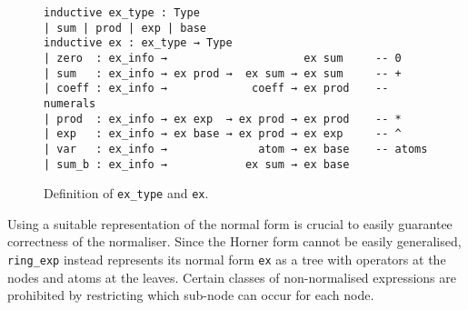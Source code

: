 \documentclass{llncs}
\newcommand{\lean}[1]{\texttt{#1}\xspace} %
\newcommand{\ex}{\lean{ex}}
\newcommand{\ring}{\lean{ring}}
\newcommand{\ringexp}{\lean{ring\_exp}}
\begin{document}

\begin{figure}
\begin{lstlisting}
inductive ex_type : Type
| sum | prod | exp | base
inductive ex : ex_type → Type
| zero  : ex_info →                     ex sum     -- 0
| sum   : ex_info → ex prod →  ex sum → ex sum     -- +
| coeff : ex_info →             coeff → ex prod    -- numerals
| prod  : ex_info → ex exp  → ex prod → ex prod    -- *
| exp   : ex_info → ex base → ex prod → ex exp     -- ^
| var   : ex_info →              atom → ex base    -- atoms
| sum_b : ex_info →            ex sum → ex base
\end{lstlisting}
\caption{Definition of \lean{ex\_type} and \ex.}
\label{fig:def_ex}
\end{figure}
Using a suitable representation of the normal form is crucial to easily guarantee correctness of the normaliser.
Since the Horner form cannot be easily generalised,
\ringexp instead represents its normal form \ex as a tree with operators at the nodes and atoms at the leaves.
Certain classes of non-normalised expressions are prohibited by restricting which sub-node can occur for each node.
\end{document}

